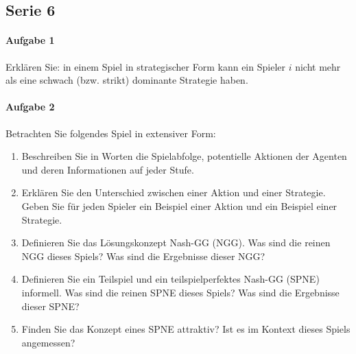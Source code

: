 \subsection{Serie 6}%
\label{sub:serie_6}

\paragraph{Aufgabe 1}%
\label{par:aufgabe_1}

Erklären Sie: in einem Spiel in strategischer Form kann ein Spieler $i$ nicht
mehr als eine schwach (bzw. strikt) dominante Strategie haben.

\paragraph{Aufgabe 2}%
\label{par:aufgabe_2}

Betrachten Sie folgendes Spiel in extensiver Form:
\begin{center}
\end{center}

\begin{enumerate}
  \item Beschreiben Sie in Worten die Spielabfolge, potentielle Aktionen der Agenten und
    deren Informationen auf jeder Stufe.

  \item Erklären Sie den Unterschied zwischen einer Aktion und einer Strategie. Geben Sie
    für jeden Spieler ein Beispiel einer Aktion und ein Beispiel einer Strategie.

  \item Definieren Sie das Lösungskonzept Nash-GG (NGG). Was sind die reinen NGG dieses
    Spiels? Was sind die Ergebnisse dieser NGG?

  \item Definieren Sie ein Teilspiel und ein teilspielperfektes Nash-GG (SPNE) informell.
    Was sind die reinen SPNE dieses Spiels? Was sind die Ergebnisse dieser SPNE?

  \item Finden Sie das Konzept eines SPNE attraktiv? Ist es im Kontext dieses Spiels
    angemessen?
\end{enumerate}

